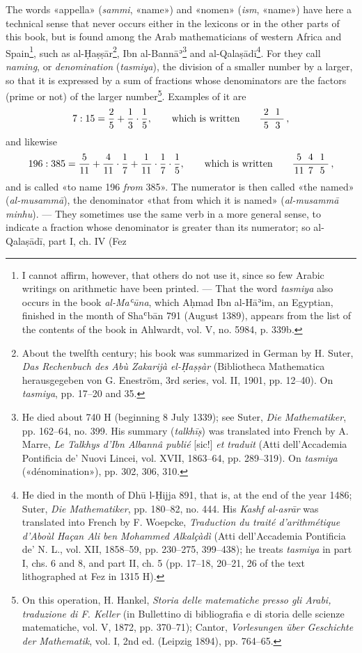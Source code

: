 \documentclass[11pt]{article}
\begin{document}
\par The words «appella» (\emph{sammi}, «name») and «nomen» (\emph{ism}, «name») have here a technical sense that never occurs either in the lexicons or in the other parts of this book, but is found among the Arab mathematicians of western Africa and Spain\footnote{I cannot affirm, however, that others do not use it, since so few Arabic writings on arithmetic have been printed. — That the word \emph{tasmiya} also occurs in the book \emph{al-Maʿūna}, which Aḥmad Ibn al-Hāʾim, an Egyptian, finished in the month of Shaʿbān 791 (August 1389), appears from the list of the contents of the book in Ahlwardt, vol. V, no. 5984, p. 339b.}, such as al-Ḥaṣṣār\footnote{About the twelfth century; his book was summarized in German by H. Suter, \emph{Das Rechenbuch des Abù Zakarijà el-Ḥaṣṣàr} (Bibliotheca Mathematica herausgegeben von G. Eneström, 3rd series, vol. II, 1901, pp. 12–40). On \emph{tasmiya}, pp. 17–20 and 35.}, Ibn al-Bannāʾ\footnote{He died about 740 H (beginning 8 July 1339); see Suter, \emph{Die Mathematiker}, pp. 162–64, no. 399. His summary (\emph{talkhīṣ}) was translated into French by A. Marre, \emph{Le Talkhys d'Ibn Albannâ publié} [sic!] \emph{et traduit} (Atti dell'Accademia Pontificia de' Nuovi Lincei, vol. XVII, 1863–64, pp. 289–319). On \emph{tasmiya} («dénomination»), pp. 302, 306, 310.} and al-Qalaṣādī\footnote{He died in the month of Dhū l-Ḥijja 891, that is, at the end of the year 1486; Suter, \emph{Die Mathematiker}, pp. 180–82, no. 444. His \emph{Kashf al-asrār} was translated into French by F. Woepcke, \emph{Traduction du traité d'arithmétique d'Aboùl Haçan Ali ben Mohammed Alkalçàdì} (Atti dell'Accademia Pontificia de' N. L., vol. XII, 1858–59, pp. 230–275, 399–438); he treats \emph{tasmiya} in part I, chs. 6 and 8, and part II, ch. 5 (pp. 17–18, 20–21, 26 of the text lithographed at Fez in 1315 H).}. For they call \emph{naming}, or \emph{denomination} (\emph{tasmiya}), the division of a smaller number by a larger, so that it is expressed by a sum of fractions whose denominators are the factors (prime or not) of the larger number\footnote{On this operation, H. Hankel, \emph{Storia delle matematiche presso gli Arabi, traduzione di F. Keller} (in Bullettino di bibliografia e di storia delle scienze matematiche, vol. V, 1872, pp. 370–71); Cantor, \emph{Vorlesungen über Geschichte der Mathematik}, vol. I, 2nd ed. (Leipzig 1894), pp. 764–65.}. Examples of it are \[ 7 : 15 = \frac{2}{5} + \frac{1}{3} \cdot \frac{1}{5}, \qquad \text{which is written} \qquad \frac{\text{\makebox[1.2em]{2}\makebox[1.2em]{1}}}{\text{\makebox[1.2em]{5}\makebox[1.2em]{3}}}\,, \] and likewise \[ 196 : 385 = \frac{5}{11} + \frac{4}{11} \cdot \frac{1}{7} + \frac{1}{11} \cdot \frac{1}{7} \cdot \frac{1}{5}, \qquad \text{which is written} \qquad \frac{\text{\makebox[1.2em]{5}\makebox[1.2em]{4}\makebox[1.2em]{1}}}{\text{\makebox[1.2em]{11}\makebox[1.2em]{7}\makebox[1.2em]{5}}}\,, \] and is called «to name 196 \emph{from} 385». The numerator is then called «the named» (\emph{al-musammā}), the denominator «that from which it is named» (\emph{al-musammā minhu}). — They sometimes use the same verb in a more general sense, to indicate a fraction whose denominator is greater than its numerator; so al-Qalaṣādī, part I, ch. IV (Fez 
\end{document}

